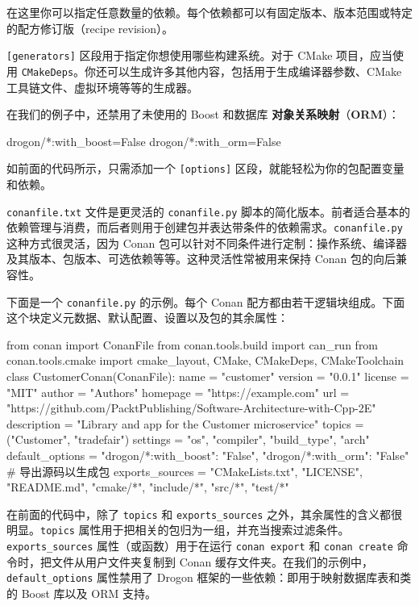 在这里你可以指定任意数量的依赖。每个依赖都可以有固定版本、版本范围或特定的配方修订版（recipe revision）。

\label{idx:730}
\texttt{[generators]} 区段用于指定你想使用哪些构建系统。对于 CMake 项目，应当使用 \texttt{CMakeDeps}。你还可以生成许多其他内容，包括用于生成编译器参数、CMake 工具链文件、虚拟环境等等的生成器。

\label{idx:731}
在我们的例子中，还禁用了未使用的 Boost 和数据库 \textbf{对象关系映射}（\textbf{ORM}）：

\begin{codebox}[text]
[options]
drogon/*:with_boost=False
drogon/*:with_orm=False
\end{codebox}

如前面的代码所示，只需添加一个 \texttt{[options]} 区段，就能轻松为你的包配置变量和依赖。

\texttt{conanfile.\allowbreak{}txt} 文件是更灵活的 \texttt{conanfile.\allowbreak{}py} 脚本的简化版本。前者适合基本的依赖管理与消费，而后者则用于创建包并表达带条件的依赖需求。\texttt{conanfile.\allowbreak{}py} 这种方式很灵活，因为 Conan 包可以针对不同条件进行定制：操作系统、编译器及其版本、包版本、可选依赖等等。这种灵活性常被用来保持 Conan 包的向后兼容性。

下面是一个 \texttt{conanfile.\allowbreak{}py} 的示例。每个 Conan 配方都由若干逻辑块组成。下面这个块定义元数据、默认配置、设置以及包的其余属性：

\begin{codebox}[python]
from conan import ConanFile
from conan.tools.build import can_run
from conan.tools.cmake import cmake_layout, CMake, CMakeDeps, CMakeToolchain
class CustomerConan(ConanFile):
    name = "customer"
    version = "0.0.1"
    license = "MIT"
    author = "Authors"
    homepage = "https://example.com"
    url = "https://github.com/PacktPublishing/Software-Architecture-with-Cpp-2E"
    description = "Library and app for the Customer microservice"
    topics = ("Customer", "tradefair")
    settings = "os", "compiler", "build_type", "arch"
    default_options = {"drogon/*:with_boost": "False", "drogon/*:with_orm": "False"}
    # 导出源码以生成包
    exports_sources = "CMakeLists.txt", "LICENSE", "README.md", "cmake/*", "include/*", "src/*", "test/*"
\end{codebox}

\label{idx:732}
在前面的代码中，除了 \texttt{topics} 和 \texttt{exports\_\allowbreak{}sources} 之外，其余属性的含义都很明显。\texttt{topics} 属性用于把相关的包归为一组，并充当搜索过滤条件。\texttt{exports\_\allowbreak{}sources} 属性（或函数）用于在运行 \texttt{conan export} 和 \texttt{conan create} 命令时，把文件从用户文件夹复制到 Conan 缓存文件夹。在我们的示例中，\texttt{default\_\allowbreak{}options} 属性禁用了 Drogon 框架的一些依赖：即用于映射数据库表和类的 Boost 库以及 ORM 支持。

